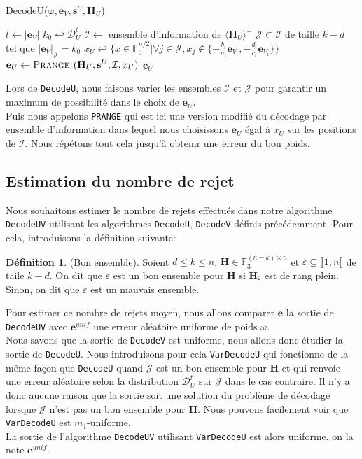 \documentclass[12pt]{article}
\theoremstyle{plain}
\theoremstyle{definition}
\newtheorem{defi}[thm]{Définition}
\newcommand{\F}{\mathbb{F}}
\newcommand{\e}{\mathbf{e}}
\newcommand{\s}{\mathbf{s}}
\newcommand{\J}{\mathcal{J}}
\newcommand{\D}{\mathcal{D}}
\begin{document}
\begin{algorithm}
	\caption{DecodeU($\varphi, \e_V, \s^U, \mathbf{H}_U$)}
	\begin{algorithmic}[1]
		\STATE $t \leftarrow |\e_V|$
		\STATE $k_0 \hookleftarrow \mathcal{D}_U^t$
		\REPEAT
		\STATE $\mathcal{I} \leftarrow$ ensemble d'information de $\langle\mathbf{H}_U\rangle^\perp$
		\STATE $\mathcal{J} \subset \mathcal{I}$ de taille $k-d$ tel que $|\e_V|_\mathcal{J} = k_0$
		\STATE $x_U \hookleftarrow \{x\in\F_3^{n/2} | \forall j\in\J,  x_j \notin \{-\frac{b_i}{a_i}\e_{V_i}, -\frac{d_i}{c_i}\e_{V_i}\}\}$
		\STATE $\e_U \leftarrow \textsc{Prange }(\mathbf{H}_U, \s^U, \mathcal{I}, x_U)$
		\UNTIL {$|\varphi(\e_U,\e_V)| \neq \omega$}
		\RETURN $\e_U$
    \end{algorithmic}
\end{algorithm}

Lors de \verb|DecodeU|, nous faisons varier les ensembles $\mathcal{I}$ et $\mathcal{J}$ pour garantir un maximum de possibilité dans le choix de $\e_U$.\\
Puis nous appelons \verb|PRANGE| qui est ici une version modifié du décodage par ensemble d'information dans lequel nous choisissons $\e_U$ égal à $x_U$ sur les positions de $\mathcal{I}$. Nous répétons tout cela jusqu'à obtenir une erreur du bon poids.

\subsection{Estimation du nombre de rejet}
Nous souhaitons estimer le nombre de rejets effectués dans notre algorithme \verb|DecodeUV| utilisant les algorithmes \verb|DecodeU|, \verb|DecodeV| définis précédemment. Pour cela, introduisons la définition suivante:

\begin{defi} (Bon ensemble).
Soient $d \leq k \leq n$, $\mathbf{H}\in\F_3^{(n-k)\times n}$ et $\varepsilon \subseteq \llbracket1,n\rrbracket$ de taile $k-d$. On dit que $\varepsilon$ est un bon ensemble pour $\mathbf{H}$ si $\mathbf{H}_{\overline{\varepsilon}}$ est de rang plein. Sinon, on dit que $\varepsilon$ est un mauvais ensemble.
\end{defi}


\noindent Pour estimer ce nombre de rejets moyen, nous allons comparer $\e$ la sortie de \verb|DecodeUV| avec $\e^{unif}$ une erreur aléatoire uniforme de poids $\omega$.\\
Nous savons que la sortie de \verb|DecodeV| est uniforme, nous allons donc étudier la sortie de \verb|DecodeU|.
Nous introduisons pour cela \verb|VarDecodeU| qui fonctionne de la même façon que \verb|DecodeU| quand $\J$ est un bon ensemble pour $\mathbf{H}$ et qui renvoie une erreur aléatoire selon la distribution $\D_U^t$ sur $\J$ dans le cas contraire.
Il n'y a donc aucune raison que la sortie soit une solution du problème de décodage lorsque $\J$ n'est pas un bon ensemble pour $\mathbf{H}$.
Nous pouvons facilement voir que \verb|VarDecodeU| est $m_1$-uniforme.\\
\noindent La sortie de l'algorithme \verb|DecodeUV| utilisant \verb|VarDecodeU| est alors uniforme, on la note $\e^{unif}$.\\
\end{document}
